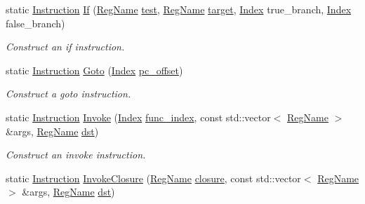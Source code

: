 \begin{DoxyCompactItemize}
static \hyperlink{structtvm_1_1runtime_1_1vm_1_1Instruction}{Instruction} \hyperlink{structtvm_1_1runtime_1_1vm_1_1Instruction_ae7a1eb87c8f583a606e89a0ad22af38b}{If} (\hyperlink{namespacetvm_1_1runtime_1_1vm_a3bbbf700719e9dc3dda2bc25210c18ae}{Reg\+Name} \hyperlink{structtvm_1_1runtime_1_1vm_1_1Instruction_adebc0e955069bdaa543df3a908351532}{test}, \hyperlink{namespacetvm_1_1runtime_1_1vm_a3bbbf700719e9dc3dda2bc25210c18ae}{Reg\+Name} \hyperlink{structtvm_1_1runtime_1_1vm_1_1Instruction_a46879dbe84105fb621a6167f8d73b223}{target}, \hyperlink{namespacetvm_1_1runtime_1_1vm_a3597867d2db714bf760876a23d6b7d3d}{Index} true\+\_\+branch, \hyperlink{namespacetvm_1_1runtime_1_1vm_a3597867d2db714bf760876a23d6b7d3d}{Index} false\+\_\+branch)
\begin{DoxyCompactList}\small\item\em Construct an if instruction. \end{DoxyCompactList}\item 
static \hyperlink{structtvm_1_1runtime_1_1vm_1_1Instruction}{Instruction} \hyperlink{structtvm_1_1runtime_1_1vm_1_1Instruction_a40b49fe5c05c5fe5f7a5c5c01bf651c8}{Goto} (\hyperlink{namespacetvm_1_1runtime_1_1vm_a3597867d2db714bf760876a23d6b7d3d}{Index} \hyperlink{structtvm_1_1runtime_1_1vm_1_1Instruction_a721907173e94d564bff879792b29f789}{pc\+\_\+offset})
\begin{DoxyCompactList}\small\item\em Construct a goto instruction. \end{DoxyCompactList}\item 
static \hyperlink{structtvm_1_1runtime_1_1vm_1_1Instruction}{Instruction} \hyperlink{structtvm_1_1runtime_1_1vm_1_1Instruction_acb19406a24fa95bf39a29d15ad6be256}{Invoke} (\hyperlink{namespacetvm_1_1runtime_1_1vm_a3597867d2db714bf760876a23d6b7d3d}{Index} \hyperlink{structtvm_1_1runtime_1_1vm_1_1Instruction_aa60b1a70648dbba4e7ec35a56a29a02d}{func\+\_\+index}, const std\+::vector$<$ \hyperlink{namespacetvm_1_1runtime_1_1vm_a3bbbf700719e9dc3dda2bc25210c18ae}{Reg\+Name} $>$ \&args, \hyperlink{namespacetvm_1_1runtime_1_1vm_a3bbbf700719e9dc3dda2bc25210c18ae}{Reg\+Name} \hyperlink{structtvm_1_1runtime_1_1vm_1_1Instruction_a17f056cc4798d31c8bcee6903be8dd1d}{dst})
\begin{DoxyCompactList}\small\item\em Construct an invoke instruction. \end{DoxyCompactList}\item 
static \hyperlink{structtvm_1_1runtime_1_1vm_1_1Instruction}{Instruction} \hyperlink{structtvm_1_1runtime_1_1vm_1_1Instruction_aff2701f8ac1a6232115e73fbb3fe522a}{Invoke\+Closure} (\hyperlink{namespacetvm_1_1runtime_1_1vm_a3bbbf700719e9dc3dda2bc25210c18ae}{Reg\+Name} \hyperlink{structtvm_1_1runtime_1_1vm_1_1Instruction_a3a175836bc0893d99935f32911e45bfd}{closure}, const std\+::vector$<$ \hyperlink{namespacetvm_1_1runtime_1_1vm_a3bbbf700719e9dc3dda2bc25210c18ae}{Reg\+Name} $>$ \&args, \hyperlink{namespacetvm_1_1runtime_1_1vm_a3bbbf700719e9dc3dda2bc25210c18ae}{Reg\+Name} \hyperlink{structtvm_1_1runtime_1_1vm_1_1Instruction_a17f056cc4798d31c8bcee6903be8dd1d}{dst})

\end{DoxyCompactItemize}
